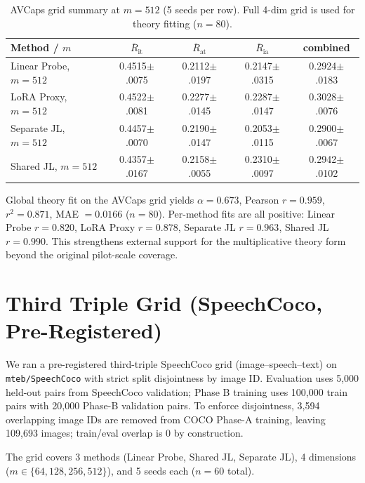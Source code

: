 \documentclass{article}
\newcommand{\avgR}{\overline{R}}
\begin{document}
\begin{table}[ht]
  \caption{AVCaps grid summary at $m=512$ (5 seeds per row). Full 4-dim grid is used for theory fitting ($n=80$).}
  \label{tab:secondtriple}
  \centering
  \footnotesize
  \begin{tabular}{lcccc}
    \toprule
    Method / $m$ & $\avgR_\mathrm{it}$ & $\avgR_\mathrm{at}$ & $\avgR_\mathrm{ia}$ & combined \\
    \midrule
    Linear Probe, $m=512$  & 0.4515$\pm$.0075 & 0.2112$\pm$.0197 & 0.2147$\pm$.0315 & 0.2924$\pm$.0183 \\
    LoRA Proxy, $m=512$    & 0.4522$\pm$.0081 & 0.2277$\pm$.0145 & 0.2287$\pm$.0147 & 0.3028$\pm$.0076 \\
    Separate JL, $m=512$   & 0.4457$\pm$.0070 & 0.2190$\pm$.0147 & 0.2053$\pm$.0115 & 0.2900$\pm$.0067 \\
    Shared JL, $m=512$     & 0.4357$\pm$.0167 & 0.2158$\pm$.0055 & 0.2310$\pm$.0097 & 0.2942$\pm$.0102 \\
    \bottomrule
  \end{tabular}
\end{table}

Global theory fit on the AVCaps grid yields $\alpha=0.673$, Pearson $r=0.959$, $r^2=0.871$, MAE $=0.0166$ ($n=80$).
Per-method fits are all positive: Linear Probe $r=0.820$, LoRA Proxy $r=0.878$, Separate JL $r=0.963$, Shared JL $r=0.990$.
This strengthens external support for the multiplicative theory form beyond the original pilot-scale coverage.

\section{Third Triple Grid (SpeechCoco, Pre-Registered)}
\label{app:thirdtriple}

We ran a pre-registered third-triple SpeechCoco grid (image--speech--text) on \texttt{mteb/SpeechCoco} with strict split disjointness by image ID.
Evaluation uses 5,000 held-out pairs from SpeechCoco validation; Phase B training uses 100,000 train pairs with 20,000 Phase-B validation pairs.
To enforce disjointness, 3,594 overlapping image IDs are removed from COCO Phase-A training, leaving 109,693 images; train/eval overlap is 0 by construction.

The grid covers 3 methods (Linear Probe, Shared JL, Separate JL), 4 dimensions ($m\in\{64,128,256,512\}$), and 5 seeds each ($n=60$ total).
\end{document}
